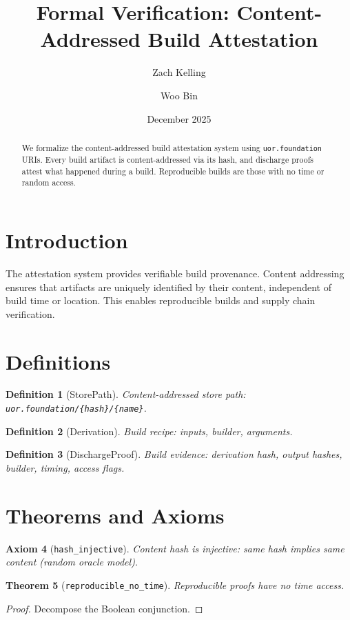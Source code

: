 \documentclass[11pt]{article}
\title{Formal Verification: Content-Addressed Build Attestation}
\author{Zach Kelling \and Woo Bin}
\date{December 2025}
\newtheorem{theorem}{Theorem}
\newtheorem{definition}[theorem]{Definition}
\newtheorem{axiom_stmt}[theorem]{Axiom}
\begin{document}
\maketitle

\begin{abstract}
We formalize the content-addressed build attestation system using \texttt{uor.foundation} URIs. Every build artifact is content-addressed via its hash, and discharge proofs attest what happened during a build. Reproducible builds are those with no time or random access.
\end{abstract}

\section{Introduction}
The attestation system provides verifiable build provenance. Content addressing ensures that artifacts are uniquely identified by their content, independent of build time or location. This enables reproducible builds and supply chain verification.

\section{Definitions}
\begin{definition}[StorePath]
Content-addressed store path: \texttt{uor.foundation/\{hash\}/\{name\}}.
\end{definition}

\begin{definition}[Derivation]
Build recipe: inputs, builder, arguments.
\end{definition}

\begin{definition}[DischargeProof]
Build evidence: derivation hash, output hashes, builder, timing, access flags.
\end{definition}


\section{Theorems and Axioms}
\begin{axiom_stmt}[\texttt{hash\_injective}]
Content hash is injective: same hash implies same content (random oracle model).
\end{axiom_stmt}

\begin{theorem}[\texttt{reproducible\_no\_time}]
Reproducible proofs have no time access.
\end{theorem}
\begin{proof}
Decompose the Boolean conjunction.
\end{proof}
\end{document}
